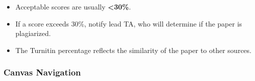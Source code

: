 \documentclass[
]{article}
\providecommand{\tightlist}{%
  \setlength{\itemsep}{0pt}\setlength{\parskip}{0pt}}
\begin{document}
\begin{enumerate}
  \begin{itemize}
  \tightlist
  \item
    Acceptable scores are usually \textbf{\textless30\%}.\\
  \item
    If a score exceeds 30\%, notify lead TA, who will determine if the paper is plagiarized.\\
  \item
    The Turnitin percentage reflects the similarity of the paper to other sources.
  \end{itemize}
\end{enumerate}

\hypertarget{canvas-navigation}{%
\subsubsection{Canvas Navigation}\label{canvas-navigation}}
\end{document}
